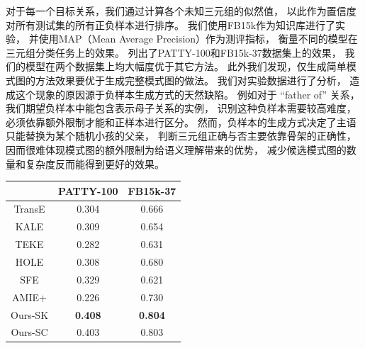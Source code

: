 对于每一个目标关系，我们通过计算各个未知三元组的似然值，
以此作为置信度对所有测试集的所有正负样本进行排序。
我们使用FB15k作为知识库进行了实验，
并使用MAP（Mean Average Precision）作为测评指标，
衡量不同的模型在三元组分类任务上的效果。
列出了PATTY-100和FB15k-37数据集上的效果，
我们的模型在两个数据集上均大幅度优于其它方法。
此外我们发现，仅生成简单模式图的方法效果要优于生成完整模式图的做法。
我们对实验数据进行了分析，
造成这个现象的原因源于负样本生成方式的天然缺陷。
例如对于 ``father of'' 关系，我们期望负样本中能包含表示母子关系的实例，
识别这种负样本需要较高难度，必须依靠额外限制才能和正样本进行区分。
然而，负样本的生成方式决定了主语只能替换为某个随机小孩的父亲，
判断三元组正确与否主要依靠骨架的正确性，
因而很难体现模式图的额外限制为给语义理解带来的优势，
减少候选模式图的数量和复杂度反而能得到更好的效果。





\begin{table}[tbh]
	\centering
	\begin{tabular}{c|cc}
		\hline
							& PATTY-100	&	FB15k-37 	\\
        \hline
		TransE				&	0.304	&	0.666	\\	%
		KALE				&	0.309	&	0.654	\\
		TEKE				&	0.282	&	0.631	\\
		HOLE				&	0.308	&	0.680	\\	%
		SFE					&	0.329	&	0.621	\\	%
		AMIE+				&	0.226	&	0.730	\\	
		\hline
		Ours-SK				&	\textbf{0.408}	&	\textbf{0.804}	\\	
		Ours-SC				&	0.403	&	0.803	\\
		\hline
	\end{tabular}
	\label{tab:triple-clsf}
\end{table}



